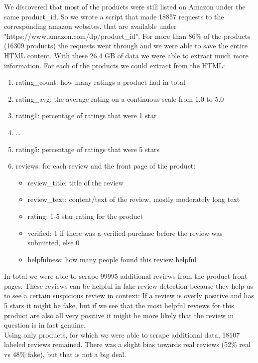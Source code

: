 \documentclass[utf8x]{ctexart}
\begin{document}
We discovered that most of the products were still listed on Amazon under the same product\_id. So we wrote a script that made 18857 requests to the corresponding amazon websites, that are available under "https://www.amazon.com/dp/product\_id". For more than 86\% of the products (16309 products) the requests went through and we were able to save the entire HTML content. With these 26.4 GB of data we were able to extract much more information. For each of the products we could extract from the HTML:
\begin{enumerate}
  \item rating\_count: how many ratings a product had in total
  \item rating\_avg: the average rating on a continuous scale from 1.0 to 5.0
  \item rating1: percentage of ratings that were 1 star
  \item \dots
  \item rating5: percentage of ratings that were 5 stars
  \item reviews: for each review and the front page of the product:
        \begin{itemize}
          \item review\_title: title of the review
          \item review\_text: content/text of the review, mostly moderately long text
          \item rating: 1-5 star rating for the product
          \item verified: 1 if there was a verified purchase before the review was submitted, else 0
          \item helpfulness: how many people found this review helpful
        \end{itemize}
\end{enumerate}

In total we were able to scrape 99995 additional reviews from the product front pages. These reviews can be helpful in fake review detection because they help us to see a certain suspicious review in context: If a review is overly positive and has 5 stars it might be fake, but if we see that the most helpful reviews for this product are also all very positive it might be more likely that the review in question is in fact genuine.\\

Using only products, for which we were able to scrape additional data, 18107 labeled reviews remained.
There was a slight bias towards real reviews (52\% real vs 48\% fake), but that is not a big deal.
\end{document}
